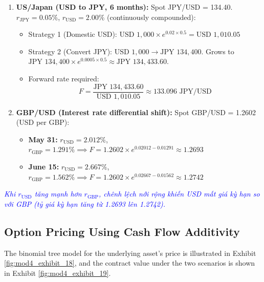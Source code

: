\begin{tcolorbox}[
	colback=gray!5!white,
	colframe=black!15!white,
	boxrule=0.5pt,
	arc=3pt,
	title=\textbf{Case Studies: Foreign Exchange forward rate calculations},
	coltitle=black,
	colbacktitle=black!5!white,
	before skip=6pt,
	after skip=6pt,
	breakable
]
\begin{enumerate}
	\item \textbf{US/Japan (USD to JPY, 6 months):} Spot JPY/USD = 134.40. $r_{\text{JPY}} = 0.05\%$, $r_{\text{USD}} = 2.00\%$ (continuously compounded):
	      \begin{itemize}
		      \item Strategy 1 (Domestic USD): $\text{USD } 1,000 \times e^{0.02 \times 0.5} = \text{USD } 1,010.05$
		      \item Strategy 2 (Convert JPY): $\text{USD } 1,000 \to \text{JPY } 134,400$. Grows to $\text{JPY } 134,400 \times e^{0.0005 \times 0.5} \approx \text{JPY } 134,433.60$.
		      \item Forward rate required:
		            \[ F = \frac{\text{JPY } 134,433.60}{\text{USD } 1,010.05} \approx 133.096 \text{ JPY/USD} \]
	      \end{itemize}
	\item \textbf{GBP/USD (Interest rate differential shift):} Spot GBP/USD = 1.2602 (USD per GBP):
	      \begin{itemize}
		      \item \textbf{May 31:} $r_{\text{USD}} = 2.012\%$, $r_{\text{GBP}} = 1.291\% \implies F = 1.2602 \times e^{0.02012 - 0.01291} \approx 1.2693$
		      \item \textbf{June 15:} $r_{\text{USD}} = 2.667\%$, $r_{\text{GBP}} = 1.562\% \implies F = 1.2602 \times e^{0.02667 - 0.01562} \approx 1.2742$
	      \end{itemize}
\end{enumerate}

\textcolor{blue}{\textit{Khi $r_{\text{USD}}$ tăng mạnh hơn $r_{\text{GBP}}$, chênh lệch nới rộng khiến USD mất giá kỳ hạn so với GBP (tỷ giá kỳ hạn tăng từ 1.2693 lên 1.2742).}}
\end{tcolorbox}

\subsection{Option Pricing Using Cash Flow Additivity}
	\label{subsec:Option Pricing Using Cash Flow Additivity}
The binomial tree model for the underlying asset's price is illustrated in Exhibit \ref{fig:mod4_exhibit_18}, and the contract value under the two scenarios is shown in Exhibit \ref{fig:mod4_exhibit_19}.


